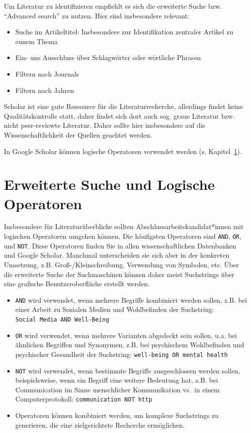 \documentclass[
  letterpaper,
  DIV=11]{scrreprt}
\providecommand{\tightlist}{%
  \setlength{\itemsep}{0pt}\setlength{\parskip}{0pt}}\usepackage{longtable,booktabs,array}
\begin{document}
Um Literatur zu identifizieren empfiehlt es sich die erweiterte Suche
bzw. ``Advanced search'' zu nutzen. Hier sind insbesondere relevant:

\begin{itemize}
\tightlist
\item
  Suche im Artikeltitel: Insbesondere zur Identifikation zentraler
  Artikel zu eunem Thema
\item
  Ein- uns Ausschluss über Schlagwörter oder wörtliche Phrasen
\item
  Filtern nach Journals
\item
  Filtern nach Jahren
\end{itemize}

Scholar ist eine gute Ressource für die Literaturrecherche, allerdings
findet keine Qualitätskontrolle statt, daher findet sich dort auch sog.
graue Literatur bzw. nicht peer-reviewte Literatur. Daher sollte hier
insbesondere auf die Wissenschaftlichkeit der Quellen geachtet werden.

In Google Scholar können logische Operatoren verwendet werden (s.
Kapitel~\ref{sec-boolean}).

\section{Erweiterte Suche und Logische Operatoren}\label{sec-boolean}

Insbesondere für Literaturüberblicke sollten
Abschlussarbeitskandidat*innen mit logischen Operatoren umgehen können.
Die häufigsten Operatoren sind \texttt{AND}, \texttt{OR}, und
\texttt{NOT}. Diese Operatoren finden Sie in allen wissenschaftlichen
Datenbanken und Google Scholar. Manchmal unterscheiden sie sich aber in
der konkreten Umsetzung, z.B. Groß-/Kleinschreibung, Verwendung von
Symbolen, etc. Über die erweiterte Suche der Suchmaschinen können daher
meist Suchstrings über eine grafische Benutzeroberfläche erstellt
werden.

\begin{itemize}
\item
  \texttt{AND} wird verwendet, wenn mehrere Begriffe kombiniert werden
  sollen, z.B. bei einer Arbeit zu Sozialen Medien und Wohlbefinden der
  Suchstring: \texttt{Social\ Media\ AND\ Well-Being}
\item
  \texttt{OR} wird verwendet, wenn mehrere Varianten abgedeckt sein
  sollen, u.a. bei ähnlichen Begriffen und Synonymen, z.B. bei
  psychischem Wohlbefinden und psychischer Gesundheit der Suchstring:
  \texttt{well-being\ OR\ mental\ health}
\item
  \texttt{NOT} wird verwendet, wenn bestimmte Begriffe ausgeschlossen
  werden sollen, beispielsweise, wenn ein Begriff eine weitere Bedeutung
  hat, z.B. bei Communication im Sinne menschlicher Kommunikation vs.~in
  einem Computerprotokoll: \texttt{communication\ NOT\ http}
\item
  Operatoren können kombiniert werden, um komplexe Suchstrings zu
  generieren, die eine zielgerichtete Recherche ermöglichen.
\end{itemize}
\end{document}
